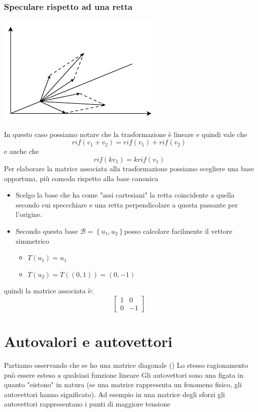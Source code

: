 \documentclass[12pt,a4paper,oneside]{article}
\begin{document}
\subsubsection*{Speculare rispetto ad una retta}
\begin{center}
	\includegraphics{Images/Speculare.pdf}
\end{center}
In questo caso possiamo notare che la trasformazione è lineare e quindi vale che
\[
	rif\left( v_1+v_2 \right) = rif\left( v_1 \right) + rif \left( v_2 \right)
\]
e anche che
\[
	rif\left( kv_1 \right) = k rif\left( v_1 \right)
\]
Per elaborare la matrice associata alla trasformazione possiamo scegliere una base opportuna, più comoda rispetto alla base canonica
\begin{itemize}
	\item Scelgo la base che ha come "assi cartesiani" la retta coincidente a quella secondo cui speccchiare e una retta perpendicolare a questa passante per l'origine.
	\item Secondo questa base $ \mathcal{B} = \left\{ u_1,u_2 \right\}  $posso calcolare facilmente il vettore simmetrico
	      \begin{itemize}
		      \item $ T\left( u_1 \right) = u_1  $
		      \item $ T\left( u_2 \right) = T\left( \left( 0,1 \right)  \right)  = \left( 0,-1 \right) $
	      \end{itemize}
\end{itemize}
quindi la matrice associata è:
\[
	\begin{bmatrix}
		1 & 0  \\
		0 & -1
	\end{bmatrix}
\]

\section{Autovalori e autovettori}
Partiamo osservando che se ho una matrice diagonale ()
Lo stesso ragionamento può essere esteso a qualsiasi funzione lineare
\vskip3mm
Gli autovettori sono una figata in quanto "eistono" in natura (se una matrice rappresenta un fenomeno fisico, gli autovettori hanno significato). Ad esempio in una matrice degli sforzi gli autovettori rappresentano i punti di maggiore tensione
\end{document}
